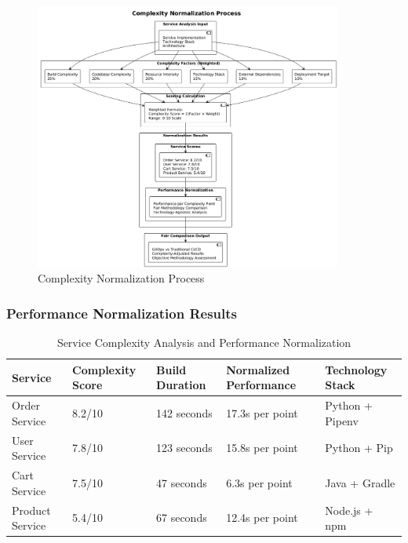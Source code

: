 \begin{figure}[h]
\centering
\includegraphics[width=0.9\textwidth]{figures/Complexity-Normalization-Process.png}
\caption{Complexity Normalization Process}
\label{fig:complexity-normalization-process}
\end{figure}

\subsubsection{Performance Normalization Results}

\begin{table}[H]
\centering
\caption{Service Complexity Analysis and Performance Normalization}
\label{tab:complexity-performance-results}
\begin{tabular}{|p{3cm}|p{2cm}|p{2.5cm}|p{2.5cm}|p{3cm}|}
\hline
\textbf{Service} & \textbf{Complexity Score} & \textbf{Build Duration} & \textbf{Normalized Performance} & \textbf{Technology Stack} \\
\hline
Order Service & 8.2/10 & 142 seconds & 17.3s per point & Python + Pipenv \\
\hline
User Service & 7.8/10 & 123 seconds & 15.8s per point & Python + Pip \\
\hline
Cart Service & 7.5/10 & 47 seconds & 6.3s per point & Java + Gradle \\
\hline
Product Service & 5.4/10 & 67 seconds & 12.4s per point & Node.js + npm \\
\hline
\end{tabular}
\end{table}

